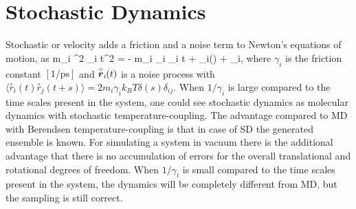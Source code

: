 \newcommand{\vrond}{\stackrel{\circ}{\ve{r}}}
\newcommand{\rond}{\stackrel{\circ}{r}}
\newcommand{\ruis}{\ve{r}^G}

\section{Stochastic Dynamics}
\label{sec:SD}
Stochastic or velocity  adds a friction
and a noise term to Newton's equations of motion, as
\beq
\label{SDeq}
m_i {\de^2 _i \over \de t^2} =
- m_i \gamma_i {\de {}_i \over \de t} + _i() + \vrond_i,
\eeq 
where $\gamma_i$ is the friction constant $[1/\mbox{ps}]$ and
$\vrond_i\!\!(t)$  is a noise process with 
$\langle \rond_i\!\!(t) \rond_j\!\!(t+s) \rangle = 
    2 m_i \gamma_i k_B T \delta(s) \delta_{ij}$.
When $1/\gamma_i$ is large compared to the time scales present in the system,
one could see stochastic dynamics as molecular dynamics with stochastic
temperature-coupling. The advantage compared to MD with Berendsen
temperature-coupling is that in case of SD the generated ensemble is known.
For simulating a system in vacuum there is the additional advantage that there is no
accumulation of errors for the overall translational and rotational
degrees of freedom.
When $1/\gamma_i$ is small compared to the time scales present in the system,
the dynamics will be completely different from MD, but the sampling is
still correct.

